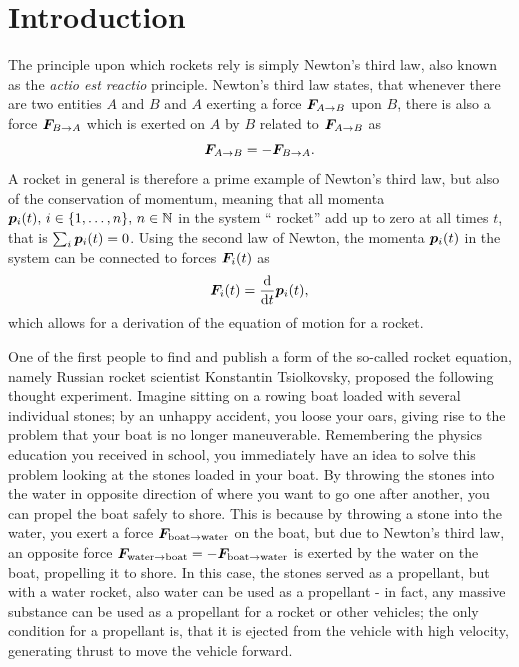 \documentclass[a4paper,11pt]{report}
\begin{document}

\newpage
{}
\tableofcontents
\FloatBarrier
\newpage
{}
\setcounter{page}{1}

\chapter{Introduction}
The principle upon which rockets rely is simply Newton's third law, also known as the \textit{actio est reactio} principle. Newton's third law states, that whenever there are two entities $A$ and $B$ and $A$ exerting a force $\bm{F}_{A\rightarrow B}$ upon $B$, there is also a force $\bm{F}_{B\rightarrow A}$ which is exerted on $A$ by $B$ related to $\bm{F}_{A\rightarrow B}$ as \begin{equation}
\bm{F}_{A\rightarrow B} = -\bm{F}_{B\rightarrow A}.
\end{equation} A rocket in general is therefore a prime example of Newton's third law, but also of the conservation of momentum, meaning that all momenta $\bm{p}_i(t),\,i\in\{1,\dots,n\},\,n\in\mathbb{N}$ in the system `` rocket'' add up to zero at all times $t$, that is 
$\sum_i \bm{p}_i(t) = 0$. Using the second law of Newton, the momenta $\bm{p}_i(t)$ in the system can be connected to forces $\bm{F}_i(t)$ as \begin{equation}
\bm{F}_i(t) = \frac{\mathrm{d}}{\mathrm{d}t}\bm{p}_i(t),
\end{equation} which allows for a derivation of the equation of motion for a rocket.

One of the first people to find and publish a form of the so-called rocket equation, namely Russian rocket scientist Konstantin Tsiolkovsky, proposed the following thought experiment. Imagine sitting on a rowing boat loaded with several individual stones; by an unhappy accident, you loose your oars, giving rise to the problem that your boat is no longer maneuverable. Remembering the physics education you received in school, you immediately have an idea to solve this problem looking at the stones loaded in your boat. By throwing the stones into the water in opposite direction of where you want to go one after another, you can propel the boat safely to shore. This is because by throwing a stone into the water, you exert a force $\bm{F}_{\text{boat}\rightarrow \text{water}}$ on the boat, but due to Newton's third law, an opposite force $\bm{F}_{\text{water}\rightarrow \text{boat}} = -\bm{F}_{\text{boat}\rightarrow \text{water}}$ is exerted by the water on the boat, propelling it to shore. In this case, the stones served as a propellant, but with a water rocket, also water can be used as a propellant - in fact, any massive substance can be used as a propellant for a rocket or other vehicles; the only condition for a propellant is, that it is ejected from the vehicle with high velocity, generating thrust to move the vehicle forward.
\end{document}
